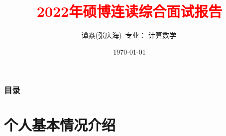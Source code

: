 \documentclass[UTF8]{ctexbeamer}	%
\title{\textcolor{red}{2022年硕博连读综合面试报告}}
\author{谭焱(张庆海)\, \newline   \newline 专业： 计算数学\, 
 }
\date{\today}
\theoremstyle{plain}
\theoremstyle{definition}
\newtheorem{emt}{}[section]
\theoremstyle{remark}
\numberwithin{equation}{section}
\begin{document}

\begin{frame}
\titlepage
\end{frame}


\begin{frame}
    \frametitle{目录}
    \tableofcontents
  \end{frame}

\section{个人基本情况介绍}


        
\end{document}
